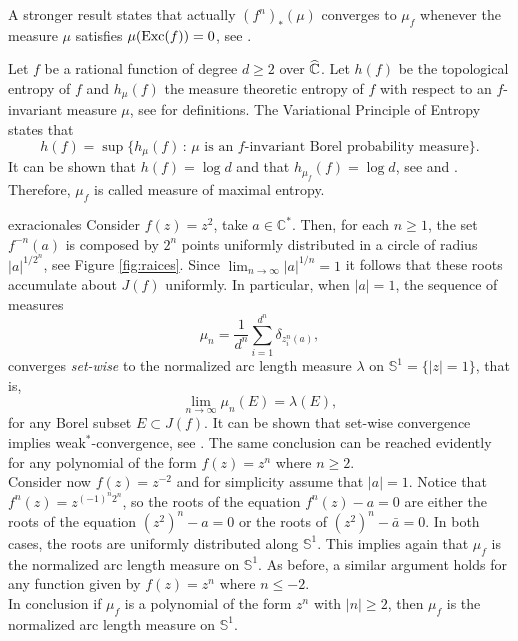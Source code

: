 \begin{myrmk}{}{}
A stronger result states that actually $(f^n)_*(\mu)$ converges to $\mu_f$ whenever the measure $\mu$ satisfies $\mu(\text{Exc}(f))=0$, see \cite[Theorem 4.1(a)]{hubbard}. 
\end{myrmk}

\begin{myrmk}{}{}
Let $f$ be a rational function of degree $d\geq 2$ over $\widehat{\mathbb{C}}$. Let $h(f)$ be the topological entropy of $f$ and $h_\mu(f)$ the measure theoretic entropy of $f$ with respect to an $f$-invariant measure $\mu$, see \cite[Chapter 11]{hawkins} for definitions. The Variational Principle of Entropy \cite[Theorem 11.40]{hawkins} states that 
$$h(f) = \sup\{h_\mu(f) \,:\, \mu \text{ is an $f$-invariant Borel probability measure}\}.$$
It can be shown that $h(f) = \log d$ and that $h_{\mu_f}(f) = \log d$, see \cite[Theorem 8.3.1]{katok} and \cite{gromov}. Therefore, $\mu_f$ is called measure of maximal entropy.
\end{myrmk}

\begin{myexmp}{}{exracionales}
Consider $f(z) = z^2$, take $a\in \mathbb{C}^*$. Then, for each $n\geq 1$, the set $f^{-n}(a)$ is composed by $2^n$ points uniformly distributed in a circle of radius $|a|^{1/2^n}$, see Figure \ref{fig:raices}. Since $\lim_{n\rightarrow \infty} |a|^{1/n}=1$ it follows that these roots accumulate about $J(f)$ uniformly. In particular, when $|a|=1$, the sequence of measures 
$$\mu_n = \frac{1}{d^n}\sum_{i=1}^{d^n} \delta_{z_i^n(a)},$$
converges {\it set-wise} to the normalized arc length measure $\lambda$ on $\mathbb{S}^1 = \{|z|=1\}$, that is,
$$\lim_{n\rightarrow \infty} \mu_n(E) = \lambda(E),$$
for any Borel subset $E\subset J(f)$. It can be shown that set-wise convergence implies wea$\text{k}^*$-convergence, see \cite[Corollary 4.7.26]{bogachev}. The same conclusion can be reached evidently for any polynomial of the form $f(z) = z^n$ where $n\geq 2$.\\

Consider now $f(z)=z^{-2}$ and for simplicity assume that $|a|=1$. Notice that $f^n(z) = z^{(-1)^n2^n}$, so the roots of the equation $f^n(z)-a=0$ are either the roots of the equation $(z^2)^n -a=0$ or the roots of $(z^2)^n -\bar{a}=0$. In both cases, the roots are uniformly distributed along $\mathbb{S}^1$. This implies again that $\mu_f$ is the normalized arc length measure on $\mathbb{S}^1$. As before, a similar argument holds for any function given by $f(z) = z^n$ where $n\leq -2$.\\

In conclusion if $\mu_f$ is a polynomial of the form $z^n$ with $|n|\geq 2$, then $\mu_f$ is the normalized arc length measure on $\mathbb{S}^1$.
\end{myexmp}

